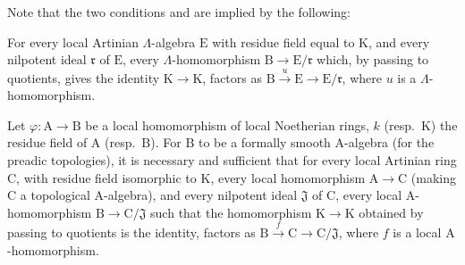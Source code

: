 \begin{remark}[22.1.3]
Note that the two conditions  and  are implied by the following:

\begin{env}[22.1.3.3]
\label{0.22.1.3.3}
For every local Artinian $\Lambda$-algebra $\mathrm{E}$ with residue field equal to $\mathrm{K}$, and every nilpotent ideal $\mathfrak{r}$ of $\mathrm{E}$, every $\Lambda$-homomorphism $\mathrm{B}\to\mathrm{E}/\mathfrak{r}$ which, by passing to quotients, gives the identity $\mathrm{K}\to\mathrm{K}$, factors as $\mathrm{B}\xrightarrow{u}\mathrm{E}\to\mathrm{E}/\mathfrak{r}$, where $u$ is a $\Lambda$-homomorphism.
\end{env}
\end{remark}

\begin{proposition}[22.1.4]
\label{0.22.1.4}
Let $\varphi:\mathrm{A}\to\mathrm{B}$ be a local homomorphism of local Noetherian rings, $k$ (resp.~$\mathrm{K}$) the residue field of $\mathrm{A}$ (resp.~$\mathrm{B}$).
For $\mathrm{B}$ to be a formally smooth $\mathrm{A}$-algebra (for the preadic topologies), it is necessary and sufficient that for every local Artinian ring $\mathrm{C}$, with residue field isomorphic to $\mathrm{K}$, every local homomorphism $\mathrm{A}\to\mathrm{C}$ (making $\mathrm{C}$ a topological $\mathrm{A}$-algebra), and every nilpotent ideal $\mathfrak{J}$ of $\mathrm{C}$, every local $\mathrm{A}$-homomorphism $\mathrm{B}\to\mathrm{C}/\mathfrak{J}$ such that the homomorphism $\mathrm{K}\to\mathrm{K}$ obtained by passing to quotients is the identity, factors as $\mathrm{B}\xrightarrow{f}\mathrm{C}\to\mathrm{C}/\mathfrak{J}$, where $f$ is a local $\mathrm{A}$-homomorphism.
\end{proposition}

